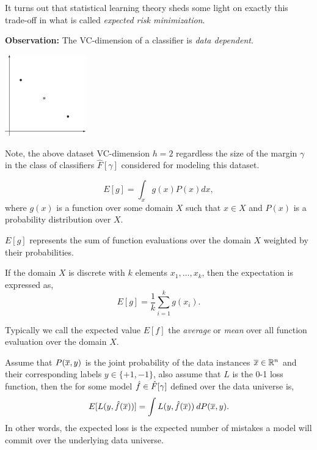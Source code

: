 \documentclass[a4paper,blends,pdf,colorBG,slideColor]{prosper}
\begin{document}
It turns out that statistical learning theory sheds some light on exactly 
this trade-off in what is called {\em expected risk minimization}.
\es


{\bf Observation:} The VC-dimension of a classifier is {\em data dependent}.
\begin{center}
\includegraphics[height=35mm]{figures/fig10-05.eps}
\end{center}

Note, the above dataset VC-dimension $h=2$
regardless the size of the margin $\gamma$ in the class of classifiers $\hat{F}[\gamma]$
considered for modeling this dataset.
\es


\[
E[g] = \int_x g(x) P(x) dx,
\]
where $g(x)$ is a function over some domain $X$ such that $x\in X$
and $P(x)$ is a probability distribution over $X$.

$E[g]$ represents the sum of function evaluations over the domain
$X$ weighted by their probabilities.  

If the domain $X$ is discrete with $k$ elements $x_1,\ldots,x_k$, then the expectation is expressed as,
\begin{equation*}
E[g] = \frac{1}{k} \sum_{i = 1}^{k} g(x_i).
\end{equation*}

Typically we call the expected value $E[f]$ the {\em average} or {\em mean} over 
all function evaluation over the domain $X$.

\es

Assume that $P(\overline{x},y)$ is the joint probability of the data instances
$\overline{x}\in \mathbb{R}^{n}$ and their corresponding labels $y\in \{+1,-1\}$, 
also assume that $L$ is the 0-1 loss function,
then the 
for some model $\hat{f}\in \hat{F}[\gamma]$ defined over the data universe is,
\begin{equation*}
E[L(y,\hat{f}(\overline{x}))] = \int  L(y,\hat{f}(\overline{x}))\: dP(\overline{x},y).
\end{equation*}
In other words, the expected loss is the expected number of mistakes a model will
commit over the underlying data universe.
\end{document}

